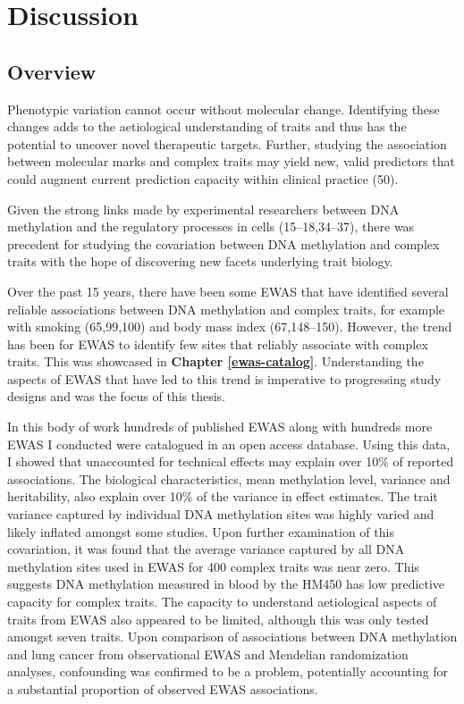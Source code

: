 \documentclass[11pt,oneside]{bristolthesis}
\begin{document}
\hypertarget{discussion-thesis}{%
\chapter{Discussion}\label{discussion-thesis}}

\hypertarget{overview-08}{%
\section{Overview}\label{overview-08}}

Phenotypic variation cannot occur without molecular change. Identifying these changes adds to the aetiological understanding of traits and thus has the potential to uncover novel therapeutic targets. Further, studying the association between molecular marks and complex traits may yield new, valid predictors that could augment current prediction capacity within clinical practice (50).

Given the strong links made by experimental researchers between DNA methylation and the regulatory processes in cells (15--18,34--37), there was precedent for studying the covariation between DNA methylation and complex traits with the hope of discovering new facets underlying trait biology.

Over the past 15 years, there have been some EWAS that have identified several reliable associations between DNA methylation and complex traits, for example with smoking (65,99,100) and body mass index (67,148--150). However, the trend has been for EWAS to identify few sites that reliably associate with complex traits. This was showcased in \textbf{Chapter \ref{ewas-catalog}}. Understanding the aspects of EWAS that have led to this trend is imperative to progressing study designs and was the focus of this thesis.

In this body of work hundreds of published EWAS along with hundreds more EWAS I conducted were catalogued in an open access database. Using this data, I showed that unaccounted for technical effects may explain over 10\% of reported associations. The biological characteristics, mean methylation level, variance and heritability, also explain over 10\% of the variance in effect estimates. The trait variance captured by individual DNA methylation sites was highly varied and likely inflated amongst some studies. Upon further examination of this covariation, it was found that the average variance captured by all DNA methylation sites used in EWAS for 400 complex traits was near zero. This suggests DNA methylation measured in blood by the HM450 has low predictive capacity for complex traits. The capacity to understand aetiological aspects of traits from EWAS also appeared to be limited, although this was only tested amongst seven traits. Upon comparison of associations between DNA methylation and lung cancer from observational EWAS and Mendelian randomization analyses, confounding was confirmed to be a problem, potentially accounting for a substantial proportion of observed EWAS associations.
\end{document}
